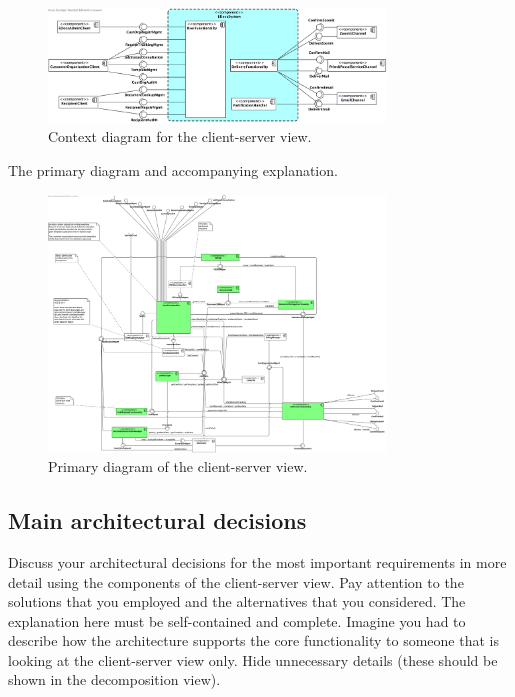 \documentclass[a4paper,10pt]{article}
\begin{document}
\begin{figure}[!htp]
	\centering
	\includegraphics[width=0.8\textwidth]{ContextDiagram.png}
	\caption{Context diagram for the client-server view.}
	\label{fig:cc-context}
\end{figure}

The primary diagram and accompanying explanation.

\begin{figure}[!htp]
	\centering
	\includegraphics[width=0.8\textwidth]{ClientServerView.png}
	\caption{Primary diagram of the client-server view.}
	\label{fig:cs-primary}
\end{figure}

\subsection{Main architectural decisions}
Discuss your architectural decisions for the most important requirements in
more detail using the components of the client-server view.
Pay attention to the solutions that you employed and the alternatives that you
considered.
The explanation here must be self-contained and complete.
Imagine you had to describe how the architecture supports the core
functionality to someone that is looking at the client-server view only.
Hide unnecessary details (these should be shown in the decomposition view).
\end{document}
